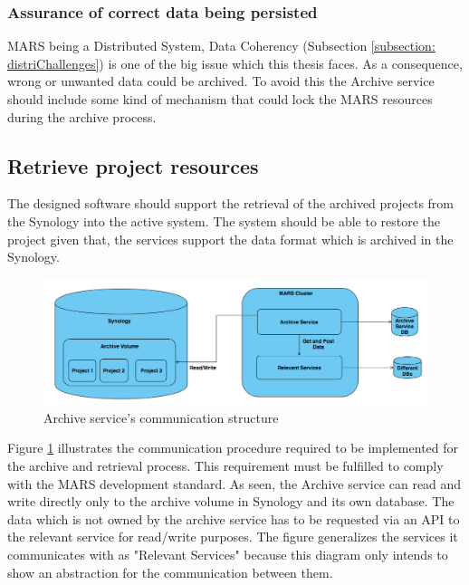         \subsubsection{Assurance of correct data being persisted}
            MARS being a Distributed System, Data Coherency (Subsection \ref{subsection: distriChallenges}) 
            is one of the big issue which this thesis faces. As a consequence,
            wrong or unwanted data could be archived. To avoid this the Archive service should include some kind of mechanism that
            could lock the MARS resources during the archive process.
        
        \subsection{Retrieve project resources}    
            The designed software should support the retrieval of the archived projects from the Synology into the active system. The
            system should be able to restore the project given that, the services support the data format which is archived in the Synology.
           
            \begin{figure}[H]
                \centering \includegraphics[scale=0.4]{grafiken/synology.png}
                \caption{Archive service's communication structure}
                \label{fig:synology}
            \end{figure}

            Figure \ref{fig:synology} illustrates the communication procedure required to be implemented for the archive and retrieval process. 
            This requirement must be fulfilled to comply with the MARS development standard. As seen, the
            Archive service can read and write directly only to the archive volume in Synology and its own database. The data which is not owned by the archive
            service has to be requested via an API to the relevant service for read/write purposes. The figure generalizes the services it communicates with
            as "Relevant Services" because this diagram only intends to show an abstraction for the communication between them.

